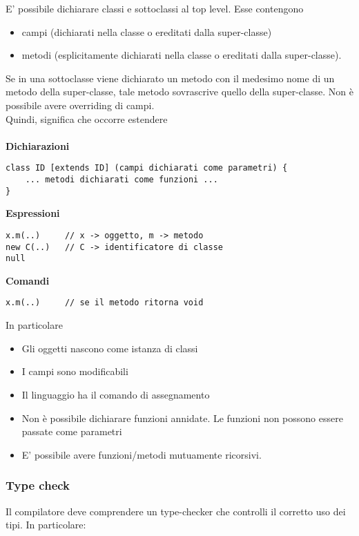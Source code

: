 \documentclass[a4paper]{article}   %
\begin{document}
E' possibile dichiarare classi e sottoclassi al top level. Esse contengono
  \begin{itemize}
    \item campi (dichiarati nella classe o ereditati dalla super-classe)
    \item metodi (esplicitamente dichiarati nella classe o ereditati dalla super-classe).
  \end{itemize}
Se in una sottoclasse viene dichiarato un metodo con il medesimo nome
di un metodo della super-classe, tale metodo sovrascrive quello della
super-classe. Non è possibile avere overriding di campi.\\
Quindi, significa che occorre estendere\\\\
\textbf{Dichiarazioni}
\begin{lstlisting}[basicstyle=\footnotesize\ttfamily]
class ID [extends ID] (campi dichiarati come parametri) {
	... metodi dichiarati come funzioni ...
}
\end{lstlisting}
\textbf{Espressioni}
\begin{lstlisting}[basicstyle=\footnotesize\ttfamily]
x.m(..)		// x -> oggetto, m -> metodo
new C(..)	// C -> identificatore di classe
null
\end{lstlisting}
\textbf{Comandi}
\begin{lstlisting}[basicstyle=\footnotesize\ttfamily]
x.m(..)		// se il metodo ritorna void
\end{lstlisting}
In particolare
\begin{itemize}

  \item Gli oggetti nascono come istanza di classi
  \item I campi sono modificabili
  \item Il linguaggio ha il comando di assegnamento
  \item Non è possibile dichiarare funzioni annidate. Le funzioni non possono
    essere passate come parametri
  \item E' possibile avere funzioni/metodi mutuamente ricorsivi.

\end{itemize}

\subsubsection{Type check}
Il compilatore deve comprendere un type-checker che controlli il corretto uso dei tipi.
In particolare:
\end{document}
